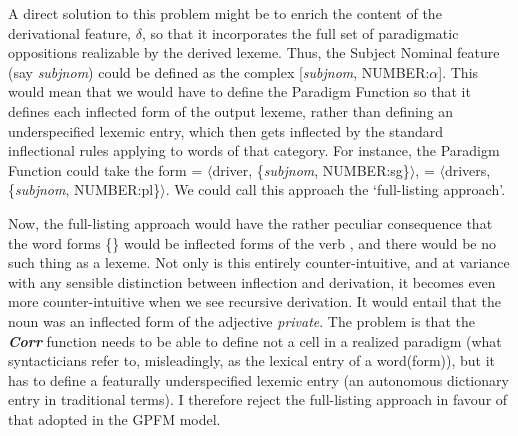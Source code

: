 \documentclass[output=paper,
modfonts
]{LSP/langsci}
\begin{document}
\begin{sloppypar}A direct solution to this problem might be to enrich the content of the derivational feature, $\delta$, so that it incorporates the full set of paradigmatic oppositions realizable by the derived lexeme. Thus, the Subject Nominal feature (say \textit{subjnom}) could be defined as the complex [\textit{subjnom}, NUMBER:$\alpha$]. This would mean that we would have to define the Paradigm Function so that it defines each inflected form of the output lexeme, rather than defining an underspecified lexemic entry, which then gets inflected by the standard inflectional rules applying to words of that category. For instance, the Paradigm Function could take the form  = $\langle$driver, \{\textit{subjnom}, NUMBER:sg\}$\rangle$,  = $\langle$drivers, \{\textit{subjnom}, NUMBER:pl\}$\rangle$. We could call this approach the ‘full-listing approach’.\end{sloppypar}


Now, the full-listing approach would have the rather peculiar consequence that the word forms \{\} would be inflected forms of the verb , and there would be no such thing as a  lexeme. Not only is this entirely counter-intuitive, and at variance with any sensible distinction between inflection and derivation, it becomes even more counter-intuitive when we see recursive derivation. It would entail that the noun  was an inflected form of the adjective \textit{private}. The problem is that the \textbf{\textit{Corr}} function needs to be able to define not a cell in a realized paradigm (what syntacticians  refer to, misleadingly, as the lexical entry of a word(form)), but it has to define a featurally underspecified lexemic entry (an autonomous dictionary entry in traditional terms). I therefore reject the full-listing approach in favour of that adopted in the GPFM model. 
\end{document}
